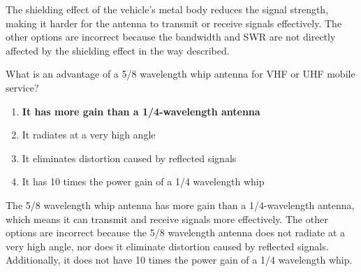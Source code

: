 The shielding effect of the vehicle's metal body reduces the signal strength, making it harder for the antenna to transmit or receive signals effectively. The other options are incorrect because the bandwidth and SWR are not directly affected by the shielding effect in the way described.

\begin{tcolorbox}[colback=gray!10!white,colframe=black!75!black,title={T9A12}]
    What is an advantage of a 5/8 wavelength whip antenna for VHF or UHF mobile service?
    \begin{enumerate}[label=\Alph*),noitemsep]
        \item \textbf{It has more gain than a 1/4-wavelength antenna}
        \item It radiates at a very high angle
        \item It eliminates distortion caused by reflected signals
        \item It has 10 times the power gain of a 1/4 wavelength whip
    \end{enumerate}
\end{tcolorbox}

The 5/8 wavelength whip antenna has more gain than a 1/4-wavelength antenna, which means it can transmit and receive signals more effectively. The other options are incorrect because the 5/8 wavelength antenna does not radiate at a very high angle, nor does it eliminate distortion caused by reflected signals. Additionally, it does not have 10 times the power gain of a 1/4 wavelength whip.
